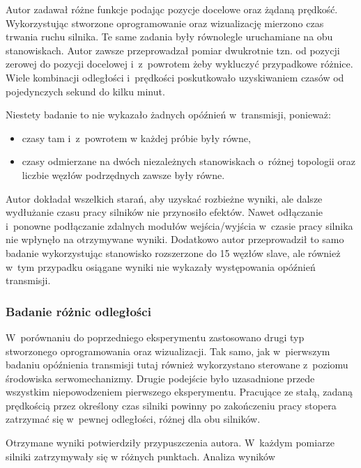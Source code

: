 Autor zadawał różne funkcje podając pozycje docelowe oraz żądaną prędkość. Wykorzystując stworzone oprogramowanie oraz wizualizację mierzono czas trwania ruchu silnika. Te same zadania były równolegle uruchamiane na obu stanowiskach. Autor zawsze przeprowadzał pomiar dwukrotnie tzn. od pozycji zerowej do pozycji docelowej i~z~powrotem żeby wykluczyć przypadkowe różnice. Wiele kombinacji odległości i~prędkości poskutkowało uzyskiwaniem czasów od pojedynczych sekund do kilku minut. 

\noindent Niestety badanie to nie wykazało żadnych opóźnień w~transmisji, ponieważ:
\begin{itemize}
\item czasy tam i~z~powrotem w każdej próbie były równe,
\item czasy odmierzane na dwóch niezależnych stanowiskach o~różnej topologii oraz liczbie węzłów podrzędnych zawsze były równe.
\end{itemize}

Autor dokładał wszelkich starań, aby uzyskać rozbieżne wyniki, ale dalsze wydłużanie czasu pracy silników nie przynosiło efektów. Nawet odłączanie i~ponowne podłączanie zdalnych modułów wejścia/wyjścia w~czasie pracy silnika nie wpłynęło na otrzymywane wyniki. Dodatkowo autor przeprowadził to samo badanie wykorzystując stanowisko rozszerzone do 15 węzłów slave, ale również w~tym przypadku osiągane wyniki nie wykazały występowania opóźnień transmisji.
\clearpage
\subsubsection{Badanie różnic odległości}
W~porównaniu do poprzedniego eksperymentu zastosowano drugi typ stworzonego oprogramowania oraz wizualizacji. Tak samo, jak w~pierwszym badaniu opóźnienia transmisji tutaj również wykorzystano sterowane z~poziomu środowiska serwomechanizmy. Drugie podejście było uzasadnione przede wszystkim niepowodzeniem pierwszego eksperymentu. Pracujące ze stałą, zadaną prędkością przez określony czas silniki powinny po zakończeniu pracy stopera zatrzymać się w~pewnej odległości, różnej dla obu silników.

Otrzymane wyniki potwierdziły przypuszczenia autora. W~każdym pomiarze silniki zatrzymywały się w różnych punktach.
Analiza wyników
%
%
%
%
